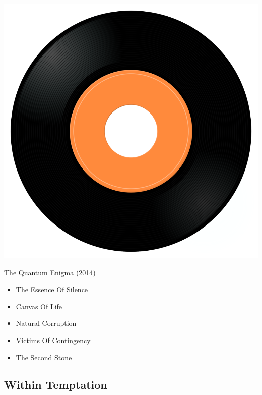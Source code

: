 \begin{minipage}[t]{0.25\textwidth}
\captionsetup{type=figure}
\includegraphics[width=\textwidth]{Images/cover.png}
\caption*{The Quantum Enigma (2014)}
\end{minipage}
\begin{minipage}[t]{0.25\textwidth}\vspace{0pt}
\begin{itemize}[nosep,leftmargin=1em,labelwidth=*,align=left]
	\setlength{\itemsep}{0pt}
	\item The Essence Of Silence
	\item Canvas Of Life
	\item Natural Corruption
	\item Victims Of Contingency
	\item The Second Stone
\end{itemize}
\end{minipage}

\subsection{Within Temptation}

